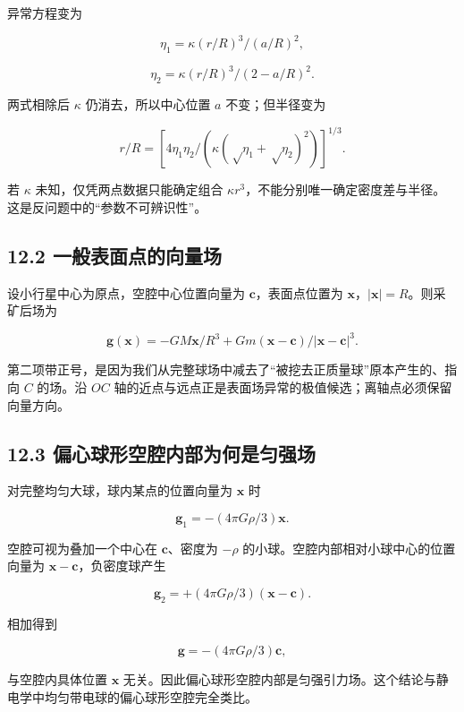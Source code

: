 \documentclass[
  11pt,
  UTF8]{ctexart}
\begin{document}
异常方程变为

\[η_1=κ(r/R)^3/(a/R)^2,\]

\[η_2=κ(r/R)^3/(2-a/R)^2.\]

两式相除后 \(κ\) 仍消去，所以中心位置 \(a\) 不变；但半径变为

\[r/R=[4η_1η_2/(κ(√η_1+√η_2)^2)]^{1/3}.\]

若 \(κ\) 未知，仅凭两点数据只能确定组合
\(κr^3\)，不能分别唯一确定密度差与半径。这是反问题中的``参数不可辨识性''。

\hypertarget{ux4e00ux822cux8868ux9762ux70b9ux7684ux5411ux91cfux573a}{%
\subsection{12.2
一般表面点的向量场}\label{ux4e00ux822cux8868ux9762ux70b9ux7684ux5411ux91cfux573a}}

设小行星中心为原点，空腔中心位置向量为 \(\boldsymbol c\)，表面点位置为
\(\boldsymbol x\)，\(|\boldsymbol x|=R\)。则采矿后场为

\[\boldsymbol g(\boldsymbol x)=-GM\boldsymbol x/R^3+Gm(\boldsymbol x-\boldsymbol c)/|\boldsymbol x-\boldsymbol c|^3.\]

第二项带正号，是因为我们从完整球场中减去了``被挖去正质量球''原本产生的、指向
\(C\) 的场。沿 \(OC\)
轴的近点与远点正是表面场异常的极值候选；离轴点必须保留向量方向。

\hypertarget{ux504fux5fc3ux7403ux5f62ux7a7aux8154ux5185ux90e8ux4e3aux4f55ux662fux5300ux5f3aux573a}{%
\subsection{12.3
偏心球形空腔内部为何是匀强场}\label{ux504fux5fc3ux7403ux5f62ux7a7aux8154ux5185ux90e8ux4e3aux4f55ux662fux5300ux5f3aux573a}}

对完整均匀大球，球内某点的位置向量为 \(\boldsymbol x\) 时

\[\boldsymbol g_1=-(4πGρ/3)\boldsymbol x.\]

空腔可视为叠加一个中心在 \(\boldsymbol c\)、密度为 \(-ρ\)
的小球。空腔内部相对小球中心的位置向量为
\(\boldsymbol x-\boldsymbol c\)，负密度球产生

\[\boldsymbol g_2=+(4πGρ/3)(\boldsymbol x-\boldsymbol c).\]

相加得到

\[\boldsymbol g=-(4πGρ/3)\boldsymbol c,\]

与空腔内具体位置 \(\boldsymbol x\)
无关。因此偏心球形空腔内部是匀强引力场。这个结论与静电学中均匀带电球的偏心球形空腔完全类比。
\end{document}
